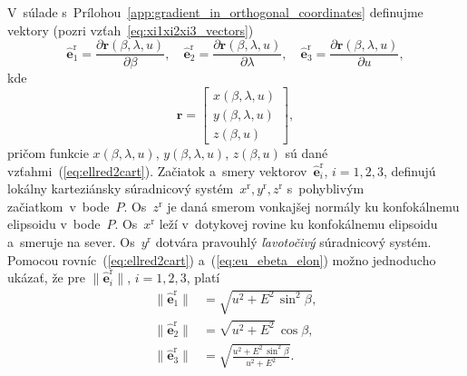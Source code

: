 \documentclass[a4paper, 12pt]{book}
\let\vec\mathbf
\begin{document}
V~súlade s~Prílohou~\ref{app:gradient_in_orthogonal_coordinates} definujme 
vektory (pozri vzťah~\ref{eq:xi1xi2xi3_vectors})
%
\begin{equation}
\label{eq:eu_ebeta_elon}
\hat{\vec e}_1^\mathrm{r} = \frac{\partial \vec r(\beta, \lambda, u)}{\partial 
\beta}{,}
%
\quad
%
\hat{\vec e}_2^\mathrm{r} = \frac{\partial \vec r(\beta, \lambda, u)}{\partial 
\lambda}{,}
%
\quad
%
\hat{\vec e}_3^\mathrm{r} = \frac{\partial \vec r(\beta, \lambda, u)}{\partial 
u}{,}
%
\end{equation}
%
kde
%
\begin{equation}
\vec r =
%
\begin{bmatrix}
x(\beta, \lambda, u)\\
y(\beta, \lambda, u)\\
z(\beta, u)
\end{bmatrix}
{,}
%
\end{equation}
%
pričom funkcie $x(\beta, \lambda, u)$, $y(\beta, \lambda, u)$, $z(\beta, u)$ sú 
dané vzťahmi~(\ref{eq:ellred2cart}).  Začiatok a~smery vektorov~$\hat{\vec 
e}_i^\mathrm{r}$, $i = 1, 2, 3$, definujú lokálny karteziánsky súradnicový 
systém~$x^\mathrm{r}, y^\mathrm{r}, z^\mathrm{r}$ s~pohyblivým 
začiatkom~v~bode~$P$.  Os~$z^\mathrm{r}$ je daná smerom vonkajšej normály ku 
konfokálnemu elipsoidu v~bode~$P$.  Os~$x^\mathrm{r}$ leží v~dotykovej rovine 
ku konfokálnemu elipsoidu a~smeruje na sever.  Os~$y^\mathrm{r}$ dotvára 
pravouhlý \emph{ľavotočivý} súradnicový systém.
%
Pomocou rovníc~(\ref{eq:ellred2cart}) a~(\ref{eq:eu_ebeta_elon}) možno 
jednoducho ukázať, že pre $\| \hat{\vec e}_i^\mathrm{r} \|$, $i = 1, 2, 3$, 
platí
%
\begin{equation}
\label{eq:ei_reduced_ell_magnitudes}
\begin{split}
\| \hat{\vec e}_1^\mathrm{r} \| &= \sqrt{u^2 + E^2 \, \sin^2\beta}{,}\\
%
\| \hat{\vec e}_2^\mathrm{r} \| &= \sqrt{ u^2 + E^2} \, \cos\beta{,}\\
%
\| \hat{\vec e}_3^\mathrm{r} \| &= \sqrt{\frac{u^2 + E^2 \, \sin^2\beta}{u^2 
+ E^2}}{.}
\end{split}
\end{equation}
\end{document}

